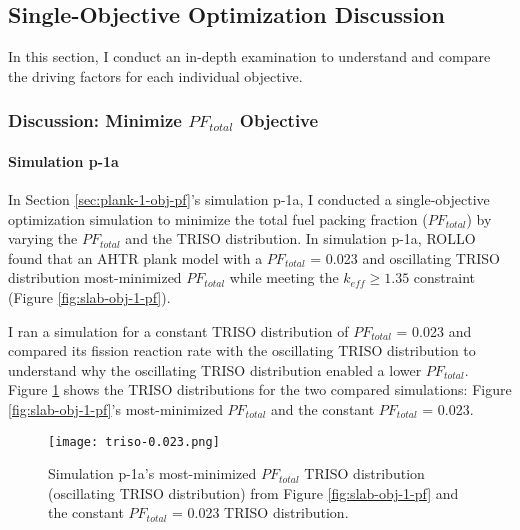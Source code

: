 \subsection{Single-Objective Optimization Discussion}
\label{sec:plank-discussion-single}
In this section, I conduct an in-depth examination to understand and compare the 
driving factors for each individual objective. 

\subsubsection{Discussion: Minimize $PF_{total}$ Objective}
\paragraph{Simulation p-1a}
In Section \ref{sec:plank-1-obj-pf}'s simulation p-1a, I conducted a single-objective 
optimization simulation to minimize the total fuel packing fraction ($PF_{total}$) by 
varying the $PF_{total}$ and the TRISO distribution. 
In simulation p-1a, \gls{ROLLO} found that an \gls{AHTR} plank model with a
$PF_{total}$ = 0.023 and oscillating TRISO distribution most-minimized 
$PF_{total}$ while meeting the $k_{eff} \geq 1.35$ constraint 
(Figure \ref{fig:slab-obj-1-pf}). 

I ran a simulation for a constant TRISO distribution of $PF_{total}$ = 0.023 and 
compared its fission reaction rate with the oscillating TRISO distribution 
to understand why the oscillating TRISO distribution enabled a lower $PF_{total}$. 
Figure \ref{fig:triso-0.023} shows the TRISO distributions for the two compared 
simulations: Figure \ref{fig:slab-obj-1-pf}'s most-minimized $PF_{total}$ 
and the constant $PF_{total}$ = 0.023. 
\begin{figure}[htbp!]
    \centering
    \texttt{[image: triso-0.023.png]} 
    \caption{Simulation p-1a's most-minimized $PF_{total}$ TRISO distribution 
    (oscillating TRISO distribution) from Figure \ref{fig:slab-obj-1-pf} and the 
    constant $PF_{total}$ = 0.023 TRISO distribution.}
    \label{fig:triso-0.023}
\end{figure}

